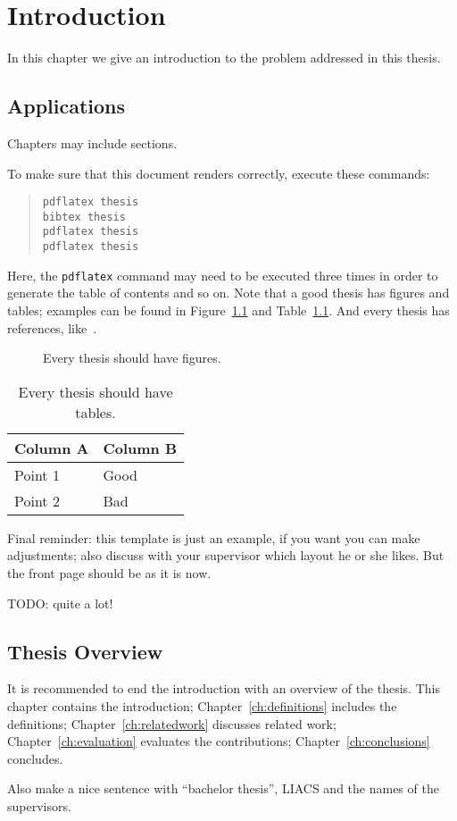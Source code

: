 \chapter{Introduction}  \label{ch:introduction}
In this chapter we give an introduction to the problem addressed in this thesis.


\section{Applications}
Chapters may include sections.

To make sure that this document renders correctly, execute these commands:
\begin{quote}
\begin{verbatim}
pdflatex thesis
bibtex thesis
pdflatex thesis
pdflatex thesis
\end{verbatim}
\end{quote}
Here, the \verb|pdflatex| command may need to be executed three times in order to generate the table of contents and so on. 
Note that a good thesis has figures and tables; examples can be found in Figure~\ref{fig:afigure} and Table~\ref{tab:atable}. And every thesis has references, like~\cite{brilliantgift15}.

\begin{figure}
\begin{center}

\end{center}
\caption{Every thesis should have figures.\label{fig:afigure}}
\end{figure}

\begin{table}
\begin{center}
\begin{tabular}{ll}
Column A & Column B\\
\hline
Point 1 & Good\\
Point 2 & Bad\\
\end{tabular}
\end{center}
\caption{Every thesis should have tables.\label{tab:atable}}
\end{table}

Final reminder: this template is just an example, if you want you can make adjustments; also discuss with your supervisor which layout he or she likes. But the front page should be as it is now.

TODO: quite a lot!

\section{Thesis Overview}
It is recommended to end the introduction with an overview of the thesis. This chapter contains the introduction; Chapter~\ref{ch:definitions} includes the definitions; Chapter~\ref{ch:relatedwork} discusses related work; Chapter~\ref{ch:evaluation} evaluates the contributions; Chapter~\ref{ch:conclusions} concludes.

Also make a nice sentence with ``bachelor thesis'', LIACS and the names of the supervisors.

